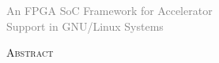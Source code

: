 \cleardoublepage
\rm
\begin{center}
	\textcolor{gray} {\large
		An FPGA SoC Framework for Accelerator\\
		Support in GNU/Linux Systems\\
	}

	\vspace{80pt}
	\textsc{\large Abstract}\\
	\vspace{50pt}
\end{center}
\blindtext
\vspace*{\fill}
